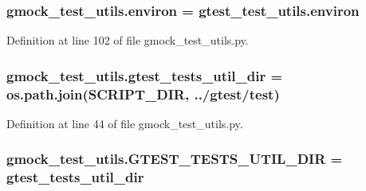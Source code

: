 \subsubsection[{\texorpdfstring{environ}{environ}}]{\setlength{\rightskip}{0pt plus 5cm}gmock\+\_\+test\+\_\+utils.\+environ = gtest\+\_\+test\+\_\+utils.\+environ}\hypertarget{namespacegmock__test__utils_a6f0938b5e8839ebc847b52a38f4d35e3}{}\label{namespacegmock__test__utils_a6f0938b5e8839ebc847b52a38f4d35e3}


Definition at line 102 of file gmock\+\_\+test\+\_\+utils.\+py.

\subsubsection[{\texorpdfstring{gtest\+\_\+tests\+\_\+util\+\_\+dir}{gtest_tests_util_dir}}]{\setlength{\rightskip}{0pt plus 5cm}gmock\+\_\+test\+\_\+utils.\+gtest\+\_\+tests\+\_\+util\+\_\+dir = os.\+path.\+join({\bf S\+C\+R\+I\+P\+T\+\_\+\+D\+IR}, \textquotesingle{}../gtest/test\textquotesingle{})}\hypertarget{namespacegmock__test__utils_af6d94170502149e7f99cfa73ddc13c00}{}\label{namespacegmock__test__utils_af6d94170502149e7f99cfa73ddc13c00}


Definition at line 44 of file gmock\+\_\+test\+\_\+utils.\+py.

\subsubsection[{\texorpdfstring{G\+T\+E\+S\+T\+\_\+\+T\+E\+S\+T\+S\+\_\+\+U\+T\+I\+L\+\_\+\+D\+IR}{GTEST_TESTS_UTIL_DIR}}]{\setlength{\rightskip}{0pt plus 5cm}gmock\+\_\+test\+\_\+utils.\+G\+T\+E\+S\+T\+\_\+\+T\+E\+S\+T\+S\+\_\+\+U\+T\+I\+L\+\_\+\+D\+IR = {\bf gtest\+\_\+tests\+\_\+util\+\_\+dir}}\hypertarget{namespacegmock__test__utils_ae7ee9324ba489b3cbd99c5e26006eba9}{}\label{namespacegmock__test__utils_ae7ee9324ba489b3cbd99c5e26006eba9}


